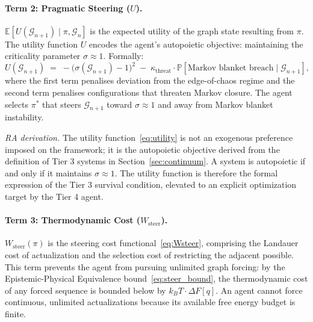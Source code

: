 \documentclass[11pt,a4paper]{article}
\theoremstyle{remark}
\newcommand{\GG}{\mathcal{G}}
\newcommand{\sigmaedge}{\sigma}
\begin{document}
\paragraph{Term 2: Pragmatic Steering ($U$).}
$\mathbb{E}[U(\GG_{n+1}) \mid \pi, \GG_n]$ is the expected utility of the
graph state resulting from $\pi$. The utility function $U$ encodes the agent's
autopoietic objective: maintaining the criticality parameter $\sigmaedge \approx 1$.
Formally:
\begin{equation}
  U(\GG_{n+1})
  \;=\;
  -\bigl(\sigmaedge(\GG_{n+1}) - 1\bigr)^2
  \;-\;
  \kappa_{\mathrm{threat}} \cdot \mathbb{P}[\text{Markov blanket breach} \mid \GG_{n+1}],
  \label{eq:utility}
\end{equation}
where the first term penalises deviation from the edge-of-chaos regime and the
second term penalises configurations that threaten Markov closure. The agent
selects $\pi^*$ that steers $\GG_{n+1}$ toward $\sigmaedge \approx 1$ and away
from Markov blanket instability.

\emph{RA derivation.} The utility function~\eqref{eq:utility} is not an
exogenous preference imposed on the framework; it is the autopoietic objective
derived from the definition of Tier 3 systems in Section~\ref{sec:continuum}.
A system is autopoietic if and only if it maintains $\sigmaedge \approx 1$. The
utility function is therefore the formal expression of the Tier 3 survival
condition, elevated to an explicit optimization target by the Tier 4 agent.

\paragraph{Term 3: Thermodynamic Cost ($W_{\mathrm{steer}}$).}
$W_{\mathrm{steer}}(\pi)$ is the steering cost functional~\eqref{eq:Wsteer},
comprising the Landauer cost of actualization and the selection cost of
restricting the adjacent possible. This term prevents the agent from pursuing
unlimited graph forcing: by the Epistemic-Physical Equivalence
bound~\eqref{eq:steer_bound}, the thermodynamic cost of any forced sequence is
bounded below by $k_BT \cdot \Delta F[q]$. An agent cannot force continuous,
unlimited actualizations because its available free energy budget is finite.
\end{document}
